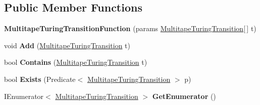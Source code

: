 \subsection*{Public Member Functions}
\begin{DoxyCompactItemize}
\item 
\mbox{\label{class_system_1_1_automata_1_1_multitape_turing_transition_function_abc2028b8c1da4d151a94e9661fc4cea3}} 
{\bfseries Multitape\+Turing\+Transition\+Function} (params \mbox{\hyperlink{class_system_1_1_automata_1_1_multitape_turing_transition}{Multitape\+Turing\+Transition}}\mbox{[}$\,$\mbox{]} t)
\item 
\mbox{\label{class_system_1_1_automata_1_1_multitape_turing_transition_function_a3a0bac9d6625523730d900a1a8dbb01a}} 
void {\bfseries Add} (\mbox{\hyperlink{class_system_1_1_automata_1_1_multitape_turing_transition}{Multitape\+Turing\+Transition}} t)
\item 
\mbox{\label{class_system_1_1_automata_1_1_multitape_turing_transition_function_a6b11b7337cbd5e84f087bfcda1def9b4}} 
bool {\bfseries Contains} (\mbox{\hyperlink{class_system_1_1_automata_1_1_multitape_turing_transition}{Multitape\+Turing\+Transition}} t)
\item 
\mbox{\label{class_system_1_1_automata_1_1_multitape_turing_transition_function_a2aa88815dde298242349e655000e9c91}} 
bool {\bfseries Exists} (Predicate$<$ \mbox{\hyperlink{class_system_1_1_automata_1_1_multitape_turing_transition}{Multitape\+Turing\+Transition}} $>$ p)
\item 
\mbox{\label{class_system_1_1_automata_1_1_multitape_turing_transition_function_a949c8706940c8bd94018b35650c42136}} 
I\+Enumerator$<$ \mbox{\hyperlink{class_system_1_1_automata_1_1_multitape_turing_transition}{Multitape\+Turing\+Transition}} $>$ {\bfseries Get\+Enumerator} ()
\end{DoxyCompactItemize}
